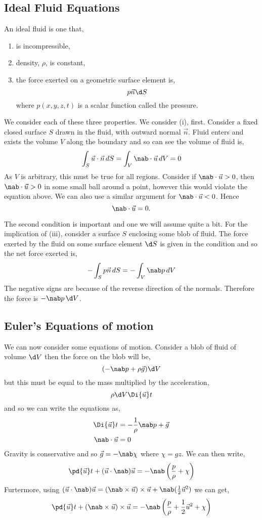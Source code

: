\subsection{Ideal Fluid Equations}
An ideal fluid is one that,
\begin{enumerate}
  \item is incompressible,
  \item density, $\rho$, is constant,
  \item the force exerted on a geometric surface element is,
  $$ p \vec n \d S $$
  where $p(x, y, z, t)$ is a scalar function called the pressure.
\end{enumerate}

\noindent
We consider each of these three properties. We consider (i), first. Consider a fixed closed surface $S$ drawn in the fluid, with outward normal $\vec n$. Fluid enters and exists the volume $V$ along the boundary and so can see the volume of fluid is,
$$ \int_S \vec u \cdot \vec n \,dS = \int_V \nab \cdot \vec u \,dV = 0 $$
As $V$ is arbitrary, this must be true for all regions. Consider if $\nab \cdot \vec u > 0$, then $\nab \cdot\vec u > 0$ in some small ball around a point, however this would violate the equation above. We can also use a similar argument for $\nab \cdot \vec u < 0$. Hence
\begin{equation}
  \nab \cdot \vec u = 0.
\end{equation}

\noindent
The second condition is important and one we will assume quite a bit. For the implication of (iii), consider a surface $S$ enclosing some blob of fluid. The force exerted by the fluid on some surface element $\d S$ is given in the condition and so the net force exerted is,
$$ -\int_S p\vec n\, dS = -\int_V \nab p\, dV $$
The negative signs are because of the reverse direction of the normals. Therefore the force is $-\nab p\, \d V$.

\subsection{Euler's Equations of motion}
We can now consider some equations of motion. Consider a blob of fluid of volume $\d V$ then the force on the blob will be,
$$ (-\nab p + \rho \vec g)\d V $$
but this must be equal to the mass multiplied by the acceleration,
$$ \rho \d V \Di {\vec u} t $$
and so we can write the equations as,
\begin{align}
  \Di {\vec u} t &= - \frac{1}{\rho}\nab p + \vec g \label{equ:eul1}\\
  \nab \cdot \vec u &= 0
\end{align}
Gravity is conservative and so $\vec g = - \nab \chi$ where $\chi = gz$. We can then write,
$$ \pd {\vec u} t + (\vec u \cdot \nab)\vec u = - \nab \left( \frac{p}{\rho} + \chi\right) $$
Furtermore, using $(\vec u \cdot \nab)\vec u = (\nab \times \vec u)\times \vec u + \nab (\frac{1}{2}\vec u^2)$ we can get,
\begin{equation}
  \pd {\vec u} t + (\nab \times \vec u)\times \vec u = - \nab \left( \frac{p}{\rho} + \frac{1}{2}\vec u^2 + \chi \right)\label{equ:eul2}
\end{equation}


